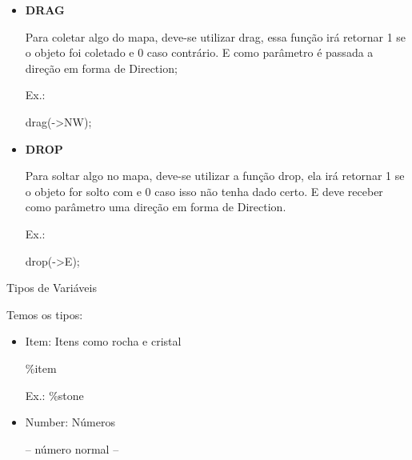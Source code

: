 \documentclass[a4paper]{article}
\begin{document}
{{{{\begin{itemize}
            x = look( %
        
        \bigskip
        
        \item \textbf{DRAG}
        
            Para coletar algo do mapa, deve-se utilizar
            \textcolor{NavyBlue}{drag},
            essa função irá retornar 1 se o objeto foi
            coletado e 0 caso contrário.
            E como parâmetro é passada a direção em forma
            de Direction;

            \textcolor{NavyBlue}{Ex.:}
            
            drag(->NW);

        \bigskip
                
        \item \textbf{DROP}
        
            Para soltar algo no mapa, deve-se utilizar 
            a função
            \textcolor{NavyBlue}{drop},
            ela irá retornar 1 se o objeto for solto com
            e 0 caso isso não tenha dado certo.
            E deve receber como parâmetro uma direção
            em forma de Direction.

            \textcolor{NavyBlue}{Ex.:}
            
            drop(->E);
            
        \end{itemize}

\newpage %


{\textcolor{NavyBlue}{\LARGE Tipos de Variáveis}

    \bigskip
    \bigskip
    
    Temos os tipos:
        
    \begin{itemize}
        
        \item \textcolor{NavyBlue}{Item:} Itens como rocha e cristal
            
            \%item
            
            \textcolor{NavyBlue}{Ex.:} \%stone
                
        \bigskip
        
        \item \textcolor{NavyBlue}{Number:} Números
            
            -- número normal --
            

\end{itemize}}}}}}
\end{document}
